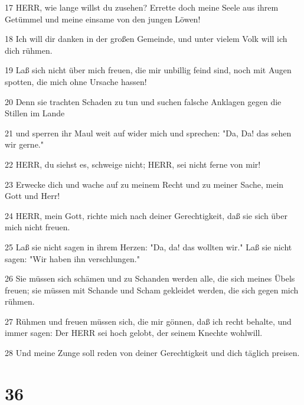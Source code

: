 \par 17 HERR, wie lange willst du zusehen? Errette doch meine Seele aus ihrem Getümmel und meine einsame von den jungen Löwen!
\par 18 Ich will dir danken in der großen Gemeinde, und unter vielem Volk will ich dich rühmen.
\par 19 Laß sich nicht über mich freuen, die mir unbillig feind sind, noch mit Augen spotten, die mich ohne Ursache hassen!
\par 20 Denn sie trachten Schaden zu tun und suchen falsche Anklagen gegen die Stillen im Lande
\par 21 und sperren ihr Maul weit auf wider mich und sprechen: "Da, Da! das sehen wir gerne."
\par 22 HERR, du siehst es, schweige nicht; HERR, sei nicht ferne von mir!
\par 23 Erwecke dich und wache auf zu meinem Recht und zu meiner Sache, mein Gott und Herr!
\par 24 HERR, mein Gott, richte mich nach deiner Gerechtigkeit, daß sie sich über mich nicht freuen.
\par 25 Laß sie nicht sagen in ihrem Herzen: "Da, da! das wollten wir." Laß sie nicht sagen: "Wir haben ihn verschlungen."
\par 26 Sie müssen sich schämen und zu Schanden werden alle, die sich meines Übels freuen; sie müssen mit Schande und Scham gekleidet werden, die sich gegen mich rühmen.
\par 27 Rühmen und freuen müssen sich, die mir gönnen, daß ich recht behalte, und immer sagen: Der HERR sei hoch gelobt, der seinem Knechte wohlwill.
\par 28 Und meine Zunge soll reden von deiner Gerechtigkeit und dich täglich preisen.

\chapter{36}

